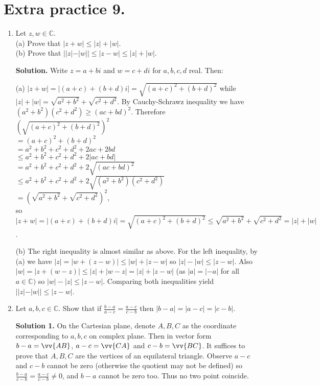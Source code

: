\documentclass[11pt]{article}
\begin{document}
\section {Extra practice 9.}
\begin{enumerate}
\item Let $z, w\in\mathbb{C}$.\\
(a) Prove that $|z+w|\le|z|+|w|$.\\
(b) Prove that $||z|-|w||\le |z-w|\le |z|+|w|$.

\textbf{Solution.} Write $z=a+bi$ and $w=c+di$ for $a,b,c,d$ real. Then:

(a) $|z+w|=|(a+c)+(b+d)i|=\sqrt{(a+c)^2+(b+d)^2}$ while $|z|+|w|=\sqrt{a^2+b^2}+\sqrt{c^2+d^2}$. By Cauchy-Schrawz inequality we have $(a^2+b^2)(c^2+d^2)\ge (ac+bd)^2$. Therefore\\ 
$(\sqrt{(a+c)^2+(b+d)^2})^2$\\
$=(a+c)^2+(b+d)^2$\\
$=a^2+b^2+c^2+d^2+2ac+2bd$\\
$\le a^2+b^2+c^2+d^2+2|ac+bd|$\\
$= a^2+b^2+c^2+d^2+2\sqrt{(ac+bd)^2}$\\
$\le a^2+b^2+c^2+d^2+2\sqrt{(a^2+b^2)(c^2+d^2)}$\\
$=(\sqrt{a^2+b^2}+\sqrt{c^2+d^2})^2$,\\
so $|z+w|=|(a+c)+(b+d)i|=\sqrt{(a+c)^2+(b+d)^2}\le \sqrt{a^2+b^2}+\sqrt{c^2+d^2}=|z|+|w|$.

(b) The right inequality is almost similar as above. For the left inequality, by (a) we have $|z|=|w+(z-w)|\le |w|+|z-w|$ so $|z|-|w|\le |z-w|$. Also $|w|=|z+(w-z)|\le |z|+|w-z|=|z|+|z-w|$ (as $|a|=|-a|$ for all $a\in\mathbb{C})$ so $|w|-|z|\le |z-w|$. Comparing both inequalities yield $||z|-|w||\le |z-w|$.

\item Let $a,b,c\in\mathbb{C}$. Show that if $\frac{b-a}{a-c}=\frac{a-c}{c-b}$ then $|b-a|=|a-c|=|c-b|$.

\textbf{Solution 1.} On the Cartesian plane, denote $A, B, C$ as the coordinate corresponding to $a,b,c$ on complex plane. Then in vector form $b-a=\vv{AB}$, $a-c=\vv{CA}$ and $c-b=\vv{BC}$. It suffices to prove that $A, B, C$ are the vertices of an equilateral triangle. Observe $a-c$ and $c-b$ cannot be zero (otherwise the quotient may not be defined) so $\frac{b-a}{c-b}=\frac{a-c}{c-b}\neq 0$, and $b-a$ cannot be zero too. Thus no two point coincide.


\end{enumerate}
\end{document}
